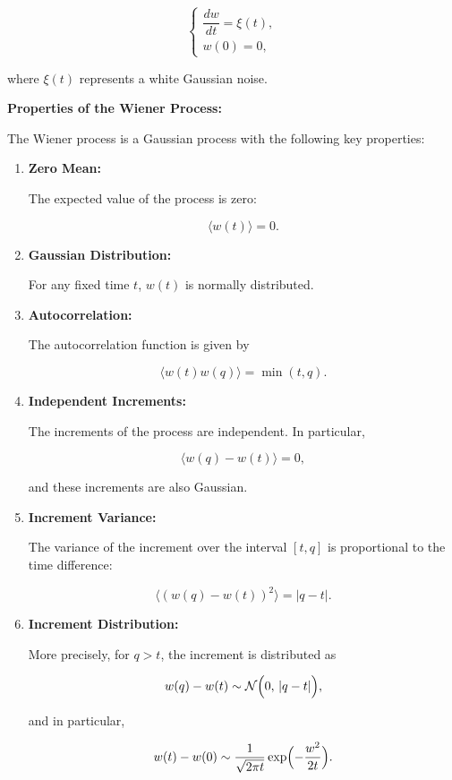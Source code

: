 $$
\begin{cases}
    \dfrac{dw}{dt} = \xi(t),\\[1mm]
    w(0) = 0,
\end{cases}
$$

where $\xi(t)$ represents a white Gaussian noise.

\vspace{0.5em}

\textbf{Properties of the Wiener Process:}

The Wiener process is a Gaussian process with the following key properties:
\begin{enumerate}
    \item \textbf{Zero Mean:}
    
    The expected value of the process is zero:

    $$\langle w(t) \rangle = 0.$$

    \item \textbf{Gaussian Distribution:}
    
    For any fixed time $t$, $w(t)$ is normally distributed.

    \vspace{0.5em}

    \item \textbf{Autocorrelation:}
    
    The autocorrelation function is given by

    $$\langle w(t)w(q) \rangle = \min(t,q).$$

    \item \textbf{Independent Increments:}
    
    The increments of the process are independent. In particular,

    $$\langle w(q)-w(t) \rangle = 0,$$

    and these increments are also Gaussian.

    \vspace{0.5em}

    \item \textbf{Increment Variance:}
    
    The variance of the increment over the interval $[t,q]$ is proportional to the time difference:

    $$\langle (w(q)-w(t))^2 \rangle = |q-t|.$$

    \item \textbf{Increment Distribution:}
    
    More precisely, for $q>t$, the increment is distributed as

    $$w(q)-w(t) \sim \mathcal{N}\Bigl(0,\,|q-t|\Bigr),$$

    and in particular,

    $$w(t)-w(0) \sim \dfrac{1}{\sqrt{2\pi t}} \exp\Bigl(-\dfrac{w^2}{2t}\Bigr).$$
\end{enumerate}


